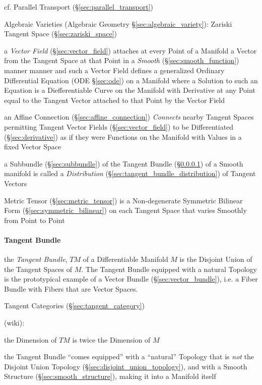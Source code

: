 \fist cf. Parallel Transport (\S\ref{sec:parallel_transport})

\fist Algebraic Varieties (Algebraic Geometry \S\ref{sec:algebraic_variety}):
Zariski Tangent Space (\S\ref{sec:zariski_space})

a \emph{Vector Field} (\S\ref{sec:vector_field}) attaches at every Point of a
Manifold a Vector from the Tangent Space at that Point in a \emph{Smooth}
(\S\ref{sec:smooth_function}) manner manner and such a Vector Field defines a
generalized Ordinary Differential Equation (ODE \S\ref{sec:ode}) on a Manifold
where a Solution to such an Equation is a Diefferentiable Curve on the Manifold
with Derivative at any Point equal to the Tangent Vector attached to that Point
by the Vector Field

\fist an Affine Connection (\S\ref{sec:affine_connection}) \emph{Connects}
nearby Tangent Spaces permitting Tangent Vector Fields
(\S\ref{sec:vector_field}) to be Differentiated (\S\ref{sec:derivative}) as if
they were Functions on the Manifold with Values in a fixed Vector Space

a Subbundle (\S\ref{sec:subbundle}) of the Tangent Bundle
(\S\ref{sec:tangent_bundle}) of a Smooth manifold is called a
\emph{Distribution} (\S\ref{sec:tangent_bundle_distribution}) of Tangent
Vectors

Metric Tensor (\S\ref{sec:metric_tensor}) is a Non-degenerate Symmetric Bilinear
Form (\S\ref{sec:symmetric_bilinear}) on each Tangent Space that varies Smoothly
from Point to Point



\paragraph{Tangent Bundle}\label{sec:tangent_bundle}\hfill

the \emph{Tangent Bundle}, $T M$ of a Differentiable Manifold $M$ is the
Disjoint Union of the Tangent Spaces of $M$. The Tangent Bundle equipped with a
natural Topology is the prototypical example of a Vector Bundle
(\S\ref{sec:vector_bundle}), i.e. a Fiber Bundle with Fibers that are Vector
Spaces.

\fist Tangent Categories (\S\ref{sec:tangent_category})

(wiki):

the Dimension of $T M$ is twice the Dimension of $M$

the Tangent Bundle ``comes equipped'' with a ``natural'' Topology that is
\emph{not} the Disjoint Union Topology (\S\ref{sec:disjoint_union_topology}),
and with a Smooth Structure (\S\ref{sec:smooth_structure}), making it into a
Manifold itself

